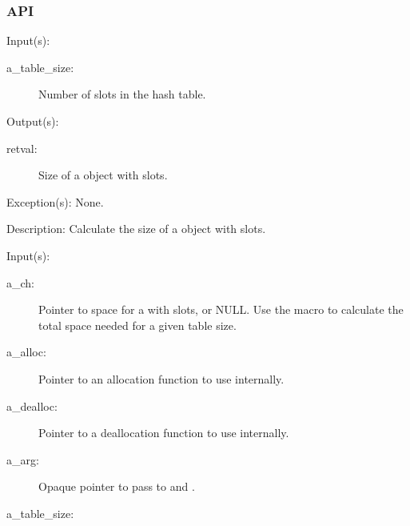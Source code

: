 \subsubsection{API}
\begin{capi}
\label{_CW_CH_TABLE2SIZEOF}
	\begin{capilist}
	\item[Input(s): ]
		\begin{description}\item[]
		\item[a\_table\_size: ]
			Number of slots in the hash table.
		\end{description}
	\item[Output(s): ]
		\begin{description}\item[]
		\item[retval: ]
			Size of a  object with
			 slots.
		\end{description}
	\item[Exception(s): ] None.
	\item[Description: ]
		Calculate the size of a  object with
		 slots.
	\end{capilist}
\label{ch_new}
	\begin{capilist}
	\item[Input(s): ]
		\begin{description}\item[]
		\item[a\_ch: ]
			Pointer to space for a \classname{ch} with
			 slots, or NULL.  Use the
			 macro to calculate
			the total space needed for a given table size.
		\item[a\_alloc: ]
			Pointer to an allocation function to use internally.
		\item[a\_dealloc: ]
			Pointer to a deallocation function to use internally.
		\item[a\_arg: ]
			Opaque pointer to pass to \cfunc{a\_alloc}{} and
			\cfunc{a\_dealloc}{}.
		\item[a\_table\_size: ]

\end{description}
\end{capilist}
\end{capi}

